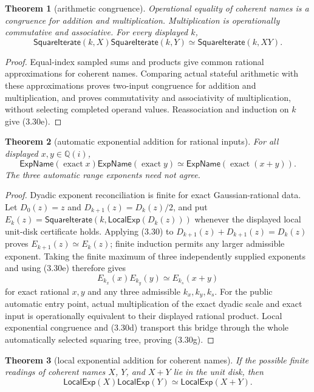 \documentclass[10pt]{article}
\newtheorem{theorem}{Theorem}[section]
\theoremstyle{definition}
\theoremstyle{remark}
\newcommand{\Qi}{\mathbb{Q}(i)}
\begin{document}
\begin{theorem}[arithmetic congruence]
Operational equality of coherent names is a congruence for addition and
multiplication.  Multiplication is operationally commutative and associative.
For every displayed $k$,
\[
 \mathsf{SquareIterate}(k,X)\mathsf{SquareIterate}(k,Y)
 \simeq \mathsf{SquareIterate}(k,XY).
\tag{3.30e}
\]
\end{theorem}

\begin{proof}
Equal-index sampled sums
and products give common rational approximations for coherent names.
Comparing actual stateful arithmetic with these approximations proves
two-input congruence for addition and multiplication, and proves
commutativity and associativity of multiplication, without selecting
completed operand values.  Reassociation and induction on $k$ give (3.30e).
\end{proof}

\begin{theorem}[automatic exponential addition for rational inputs]
For all displayed $x,y\in\Qi$,
\[
 \mathsf{ExpName}(\operatorname{exact}x)
 \mathsf{ExpName}(\operatorname{exact}y)
 \simeq
 \mathsf{ExpName}(\operatorname{exact}(x+y)).
\tag{3.30g}
\]
The three automatic range exponents need not agree.
\end{theorem}

\begin{proof}
Dyadic exponent reconciliation is finite for exact Gaussian-rational data.
Let $D_0(z)=z$ and $D_{k+1}(z)=D_k(z)/2$, and put
$E_k(z)=\mathsf{SquareIterate}(k,\mathsf{LocalExp}(D_k(z)))$ whenever the
displayed local unit-disk certificate holds.  Applying (3.30) to
$D_{k+1}(z)+D_{k+1}(z)=D_k(z)$ proves $E_{k+1}(z)\simeq E_k(z)$; finite
induction permits any larger admissible exponent.  Taking the finite maximum
of three independently supplied exponents and using (3.30e) therefore gives
\[
 E_{k_x}(x)E_{k_y}(y)\simeq E_{k_s}(x+y)
 \tag{3.30f}
\]
for exact rational $x,y$ and any three admissible $k_x,k_y,k_s$.
For the public automatic entry point, actual multiplication of the exact
dyadic scale and exact input is operationally equivalent to their displayed
rational product.  Local exponential congruence and (3.30d) transport this
bridge through the whole automatically selected squaring tree, proving
(3.30g).
\end{proof}

\begin{theorem}[local exponential addition for coherent names]
If the possible finite readings of coherent names $X$, $Y$, and $X+Y$ lie in
the unit disk, then
\[
 \mathsf{LocalExp}(X)\mathsf{LocalExp}(Y)
 \simeq \mathsf{LocalExp}(X+Y).
\tag{3.30h}
\]
\end{theorem}
\end{document}
